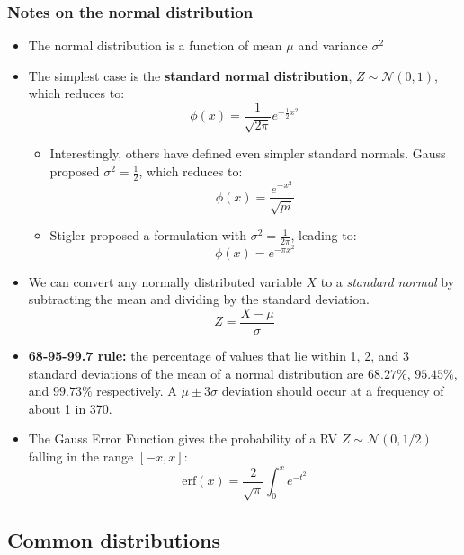 \documentclass{article}
\begin{document}
\begin{multicols*}{2}
\begin{itemize}
\end{itemize}

\subsubsection{Notes on the normal distribution}
\begin{itemize}
    \item The normal distribution is a function of mean $\mu$ and variance $\sigma^2$
    \item The simplest case is the \textbf{standard normal distribution}, $Z \sim \mathcal{N}(0, 1)$, which reduces to:
    $$\phi(x) = \frac{1}{\sqrt{2\pi}}e^{-\frac{1}{2}x^2}$$

    \begin{itemize}
        \item Interestingly, others have defined even simpler standard normals. Gauss proposed $\sigma^2 = \frac{1}{2}$, which reduces to:
        $$\phi(x) = \frac{e^{-x^2}}{\sqrt{pi}}$$

        \item Stigler proposed a formulation with $\sigma^2 = \frac{1}{2\pi}$, leading to:
        $$\phi(x) = e^{-\pi x^2}$$

    \end{itemize}
    \item We can convert any normally distributed variable $X$ to a \emph{standard normal} by subtracting the mean and dividing by the standard deviation.
    $$ Z = \frac{X - \mu}{\sigma} $$
    \item \textbf{68-95-99.7 rule:} the percentage of values that lie within 1, 2, and 3 standard deviations of the mean of a normal distribution are $68.27\%$, $95.45\%$, and $99.73\%$ respectively. A $\mu \pm 3\sigma$ deviation should occur at a frequency of about 1 in 370.
    \item The Gauss Error Function gives the probability of a RV $Z \sim \mathcal{N}(0, 1/2)$ falling in the range $[-x, x]$:
    $$ \mathrm{erf}(x) = \frac{2}{\sqrt{\pi}}\int_{0}^{x}e^{-t^2}$$

\end{itemize}


\end{multicols*}

\subsection{Common distributions}
\end{document}
